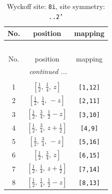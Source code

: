 \documentclass[fleqn,8pt]{jsarticle}
\begin{document}
\renewcommand{\arraystretch}{1.2}
\begin{longtable}{ccc}
\caption{Wyckoff site: {\tt 8i}, site symmetry: {\tt ..2'}}
 \\
 \hline \hline
No. & position & mapping \\ \hline \endfirsthead

\multicolumn{2}{l}{\tablename\ \thetable{}} \\
 \hline \hline
No. & position & mapping \\ \hline \endhead

 \hline \hline
\multicolumn{2}{r}{\footnotesize\it continued ...} \\ \endfoot

 \hline \hline
\multicolumn{2}{r}{} \\ \endlastfoot

1 & $\left[ \frac{1}{2},\, \frac{1}{4},\, z \right]$ & {\tt [1,12]} \\ \hline
2 & $\left[ \frac{1}{2},\, \frac{1}{4},\, - z \right]$ & {\tt [2,11]} \\ \hline
3 & $\left[ \frac{1}{2},\, \frac{3}{4},\, \frac{1}{2} - z \right]$ & {\tt [3,10]} \\ \hline
4 & $\left[ \frac{1}{2},\, \frac{3}{4},\, z + \frac{1}{2} \right]$ & {\tt [4,9]} \\ \hline
5 & $\left[ \frac{1}{2},\, \frac{3}{4},\, - z \right]$ & {\tt [5,16]} \\ \hline
6 & $\left[ \frac{1}{2},\, \frac{3}{4},\, z \right]$ & {\tt [6,15]} \\ \hline
7 & $\left[ \frac{1}{2},\, \frac{1}{4},\, z + \frac{1}{2} \right]$ & {\tt [7,14]} \\ \hline
8 & $\left[ \frac{1}{2},\, \frac{1}{4},\, \frac{1}{2} - z \right]$ & {\tt [8,13]} \\
\end{longtable}
\renewcommand{\arraystretch}{1.2}
\end{document}
